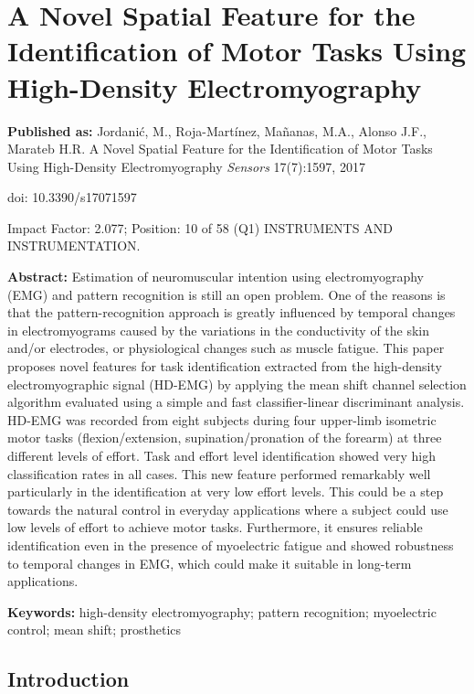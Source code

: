 \chapter[A Novel Feature for Task Identification]{A Novel Spatial Feature for the Identification of Motor Tasks Using High-Density Electromyography}
\label{ch:p3}
\textbf{Published as:} 
Jordanić, M., Roja-Martínez,  Ma\~nanas, M.A., Alonso J.F., Marateb H.R.
A Novel Spatial Feature for the Identification of Motor Tasks Using High-Density Electromyography 
\textit{Sensors} 17(7):1597, 2017

doi: 10.3390/s17071597

Impact Factor: 2.077; Position: 10 of 58 (Q1) INSTRUMENTS AND INSTRUMENTATION.


\textbf{Abstract:} Estimation of neuromuscular intention using electromyography (EMG) and pattern recognition is still an open problem. One of the reasons is that the pattern-recognition approach is greatly influenced by temporal changes in electromyograms caused by the variations in the conductivity of the skin and/or electrodes, or physiological changes such as muscle fatigue. This paper proposes novel features for task identification extracted from the high-density electromyographic signal (HD-EMG) by applying the mean shift channel selection algorithm evaluated using a simple and fast classifier-linear discriminant analysis. HD-EMG was recorded from eight subjects during four upper-limb isometric motor tasks (flexion/extension, supination/pronation of the forearm) at three different levels of effort. Task and effort level identification showed very high classification rates in all cases. This new feature performed remarkably well particularly in the identification at very low effort levels. This could be a step towards the natural control in everyday applications where a subject could use low levels of effort to achieve motor tasks. Furthermore, it ensures reliable identification even in the presence of myoelectric fatigue and showed robustness to temporal changes in EMG, which could make it suitable in long-term applications.

\textbf{Keywords:}  high-density electromyography; pattern recognition; myoelectric control; mean shift; prosthetics

\section{Introduction}

